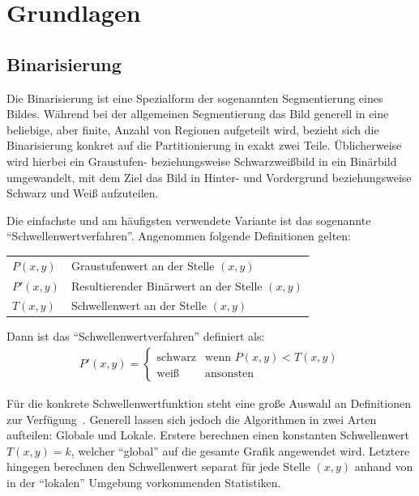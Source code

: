 \chapter{Grundlagen}%
\label{cha:essentials}

\section{Binarisierung}%
\label{sec:essentials_binarization}

Die Binarisierung ist eine Spezialform der sogenannten Segmentierung eines Bildes.
Während bei der allgemeinen Segmentierung das Bild generell in eine beliebige, aber finite, Anzahl von Regionen aufgeteilt wird, bezieht sich die Binarisierung konkret auf die Partitionierung in exakt zwei Teile.
Üblicherweise wird hierbei ein Graustufen- beziehungsweise Schwarzweißbild in ein Binärbild umgewandelt, mit dem Ziel das Bild in Hinter- und Vordergrund beziehungsweise Schwarz und Weiß aufzuteilen.

Die einfachste und am häufigsten verwendete Variante ist das sogenannte \enquote{Schwellenwertverfahren}.
Angenommen folgende Definitionen gelten:

\begin{tabu}{lX}
    \(P(x,y)\) & Graustufenwert an der Stelle \((x,y)\) \\
    \(P'(x,y)\) & Resultierender Binärwert an der Stelle \((x,y)\) \\
    \(T(x,y)\) & Schwellenwert an der Stelle \((x,y)\)
\end{tabu}

Dann ist das \enquote{Schwellenwertverfahren} definiert als:
\begin{gather}
    P'(x,y) = \begin{cases}
        \text{schwarz} & \text{wenn } P(x,y) < T(x,y) \\
        \text{weiß} & \text{ansonsten}
    \end{cases}
\end{gather}

Für die konkrete Schwellenwertfunktion steht eine große Auswahl an Definitionen zur Verfügung~\cite{DBLP:journals/jei/SezginS04}.
Generell lassen sich jedoch die Algorithmen in zwei Arten aufteilen: Globale und Lokale.
Erstere berechnen einen konstanten Schwellenwert \(T(x,y) = k\), welcher \enquote{global} auf die gesamte Grafik angewendet wird.
Letztere hingegen berechnen den Schwellenwert separat für jede Stelle \((x,y)\) anhand von in der \enquote{lokalen} Umgebung vorkommenden Statistiken.

